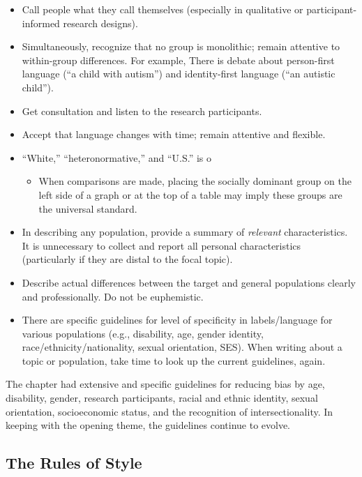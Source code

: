 \documentclass[
  11pt,
]{book}
\providecommand{\tightlist}{%
  \setlength{\itemsep}{0pt}\setlength{\parskip}{0pt}}
\begin{document}
\begin{itemize}
\tightlist
\item
  Call people what they call themselves (especially in qualitative or participant-informed research designs).\\
\item
  Simultaneously, recognize that no group is monolithic; remain attentive to within-group differences. For example, There is debate about person-first language (``a child with autism'') and identity-first language (``an autistic child'').
\item
  Get consultation and listen to the research participants.
\item
  Accept that language changes with time; remain attentive and flexible.
\item
  ``White,'' ``heteronormative,'' and ``U.S.'' is o

  \begin{itemize}
  \tightlist
  \item
    When comparisons are made, placing the socially dominant group on the left side of a graph or at the top of a table may imply these groups are the universal standard.
  \end{itemize}
\item
  In describing any population, provide a summary of \emph{relevant} characteristics. It is unnecessary to collect and report all personal characteristics (particularly if they are distal to the focal topic).
\item
  Describe actual differences between the target and general populations clearly and professionally. Do not be euphemistic.
\item
  There are specific guidelines for level of specificity in labels/language for various populations (e.g., disability, age, gender identity, race/ethnicity/nationality, sexual orientation, SES). When writing about a topic or population, take time to look up the current guidelines, again.
\end{itemize}

The chapter had extensive and specific guidelines for reducing bias by age, disability, gender, research participants, racial and ethnic identity, sexual orientation, socioeconomic status, and the recognition of intersectionality. In keeping with the opening theme, the guidelines continue to evolve.

\hypertarget{the-rules-of-style}{%
\subsection{The Rules of Style}\label{the-rules-of-style}}
\end{document}
